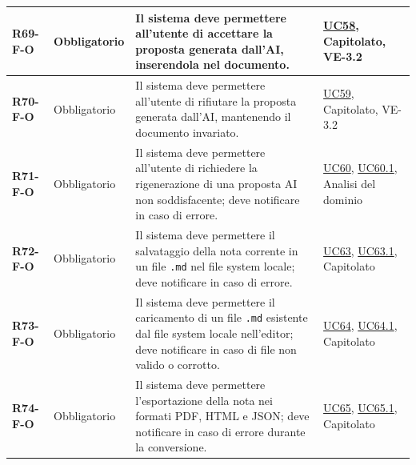 \begin{longtable}{|p{2.5cm}|p{2.2cm}|p{6.8cm}|p{2.7cm}|}
	\textbf{R69-F-O} & Obbligatorio & Il sistema deve permettere all'utente di accettare la proposta generata dall'AI, inserendola nel documento. & \hyperlink{uc58}{UC58}, Capitolato, VE-3.2 \\ \hline
	\textbf{R70-F-O} & Obbligatorio & Il sistema deve permettere all'utente di rifiutare la proposta generata dall'AI, mantenendo il documento invariato. & \hyperlink{uc59}{UC59}, Capitolato, VE-3.2 \\ \hline
	\textbf{R71-F-O} & Obbligatorio & Il sistema deve permettere all'utente di richiedere la rigenerazione di una proposta AI non soddisfacente; deve notificare in caso di errore. & \hyperlink{uc60}{UC60}, \hyperlink{uc60.1}{UC60.1}, Analisi del dominio \\ \hline

	\textbf{R72-F-O} & Obbligatorio & Il sistema deve permettere il salvataggio della nota corrente in un file \texttt{.md} nel file system locale; deve notificare in caso di errore. & \hyperlink{uc63}{UC63}, \hyperlink{uc63.1}{UC63.1}, Capitolato \\ \hline
	\textbf{R73-F-O} & Obbligatorio & Il sistema deve permettere il caricamento di un file \texttt{.md} esistente dal file system locale nell'editor; deve notificare in caso di file non valido o corrotto. & \hyperlink{uc64}{UC64}, \hyperlink{uc64.1}{UC64.1}, Capitolato \\ \hline
	\textbf{R74-F-O} & Obbligatorio & Il sistema deve permettere l'esportazione della nota nei formati PDF, HTML e JSON; deve notificare in caso di errore durante la conversione. & \hyperlink{uc65}{UC65}, \hyperlink{uc65.1}{UC65.1}, Capitolato \\ \hline


\end{longtable}
